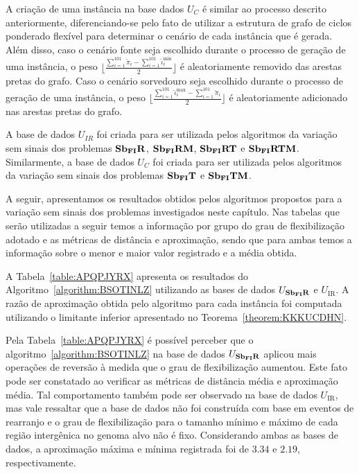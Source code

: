 A criação de uma instância na base dados $U_{C}$ é similar ao processo descrito anteriormente, diferenciando-se pelo fato de utilizar a estrutura de grafo de ciclos ponderado flexível para determinar o cenário de cada instância que é gerada. Além disso, caso o cenário fonte seja escolhido durante o processo de geração de uma instância, o peso $\lfloor\frac{\sum_{i = 1}^{101}\breve\pi_i - \sum_{i = 1}^{101}\breve\iota^{\min}_i}{2}\rfloor$ é aleatoriamente removido das arestas pretas do grafo. Caso o cenário sorvedouro seja escolhido durante o processo de geração de uma instância, o peso $\lfloor\frac{\sum_{i = 1}^{101}\breve\iota^{\max}_i - \sum_{i = 1}^{101}\breve\pi_i}{2}\rfloor$ é aleatoriamente adicionado nas arestas pretas do grafo. 

A base de dados $U_{IR}$ foi criada para ser utilizada pelos algoritmos da variação sem sinais dos problemas $\textbf{Sb\textsubscript{FI}R}{}$, $\textbf{Sb\textsubscript{FI}RM}{}$, $\textbf{Sb\textsubscript{FI}RT}{}$ e $\textbf{Sb\textsubscript{FI}RTM}{}$. Similarmente, a base de dados $U_{C}$ foi criada para ser utilizada pelos algoritmos da variação sem sinais dos problemas $\textbf{Sb\textsubscript{FI}T}{}$ e $\textbf{Sb\textsubscript{FI}TM}{}$.

A seguir, apresentamos os resultados obtidos pelos algoritmos propostos para a variação sem sinais dos problemas investigados neste capítulo. Nas tabelas que serão utilizadas a seguir temos a informação por grupo do grau de flexibilização adotado e as métricas de distância e aproximação, sendo que para ambas temos a informação sobre o menor e maior valor registrado e a média obtida.

A Tabela~\ref{table:APQPJYRX} apresenta os resultados do Algoritmo~\ref{algorithm:BSOTINLZ} utilizando as bases de dados $U_{\textbf{Sb\textsubscript{FI}R}}{}$ e $U_{\text{IR}}$. A razão de aproximação obtida pelo algoritmo para cada instância foi computada utilizando o limitante inferior apresentado no Teorema~\ref{theorem:KKKUCDHN}.



Pela Tabela~\ref{table:APQPJYRX} é possível perceber que o algoritmo~\ref{algorithm:BSOTINLZ} na base de dados $U_{\textbf{Sb\textsubscript{FI}R}}{}$ aplicou mais operações de reversão à medida que o grau de flexibilização aumentou. Este fato pode ser constatado ao verificar as métricas de distância média e aproximação média. Tal comportamento também pode ser observado na base de dados $U_{\text{IR}}$, mas vale ressaltar que a base de dados não foi construída com base em eventos de rearranjo e o grau de flexibilização para o tamanho mínimo e máximo de cada região intergênica no genoma alvo não é fixo. Considerando ambas as bases de dados, a aproximação máxima e mínima registrada foi de $3.34$ e $2.19$, respectivamente.

